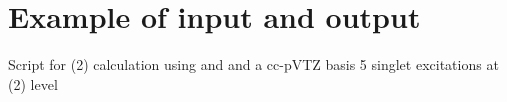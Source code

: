\chapter{Example of \molsturm input and output}
\label{apx:MolsturmIO}

\python
Script for {\ADC}(2) calculation using \molsturm and \adcman
and a cc-pVTZ basis
5 singlet excitations at {\ADC}(2) level

\begin{center}
\begin{minipage}{0.7\textwidth}

\end{minipage}
\begin{minipage}{0.85\textwidth}
	
\end{minipage}
\begin{minipage}{0.85\textwidth}
	
\end{minipage}
\end{center}

